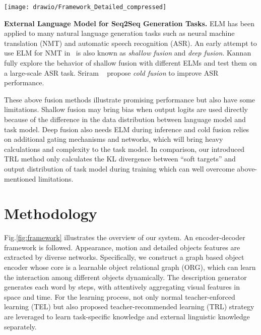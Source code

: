 \documentclass[10pt,twocolumn,letterpaper]{article}
\begin{document}
\begin{figure*}
	\centering
	\texttt{[image: drawio/Framework\_Detailed\_compressed]}
	\caption{The overview of our proposed ORG-TRL system. It mainly consists of the ORG based object encoder presented in the top-left box, and the hierarchical decoder with temporal/spatial attention in the top-right box. Our model is under the co-guidance of the novel TRL in the bottom-left box and the common TEL in the bottom-right. It also illustrates a virtual example during training: when $t=3$, the TEL forces the model to learn ``talk'', but the TRL recommends the model to learn more words via the knowledge from ELM.}
	\label{fig:framework}
	\vspace{-0.5cm}
\end{figure*}


\textbf{External Language Model for Seq2Seq Generation Tasks.} ELM has been applied to many natural language generation tasks such as neural machine translation (NMT) and automatic speech recognition (ASR). An early attempt to use ELM for NMT in~\cite{Guelcehre2015} is also known as \textit{shallow fusion} and \textit{deep fusion}. Kannan \etal~\cite{Kannan2018} fully explore the behavior of shallow fusion with different ELMs and test them on a large-scale ASR task. Sriram \etal~\cite{Sriram2018} propose \textit{cold fusion} to improve ASR performance.

These above fusion methods illustrate promising performance but also have some limitations. Shallow fusion may bring bias when output logits are used directly because of the difference in the data distribution between language model and task model. Deep fusion also needs ELM during inference and cold fusion relies on additional gating mechanisms and networks, which will bring heavy calculations and complexity to the task model. In comparison, our introduced TRL method only calculates the KL divergence between ``soft targets'' and output distribution of task model during training which can well overcome above-mentioned limitations.



\section{Methodology}

Fig.\ref{fig:framework} illustrates the overview of our system. An encoder-decoder framework is followed. Appearance, motion and detailed objects features are extracted by diverse networks. Specifically, we construct a graph based object encoder whose core is a learnable object relational graph (ORG), which can learn the interaction among different objects dynamically. The description generator generates each word by steps, with attentively aggregating visual features in space and time. For the learning process, not only normal teacher-enforced learning (TEL) but also proposed teacher-recommended learning (TRL) strategy are leveraged to learn task-specific knowledge and external linguistic knowledge separately.
\end{document}

